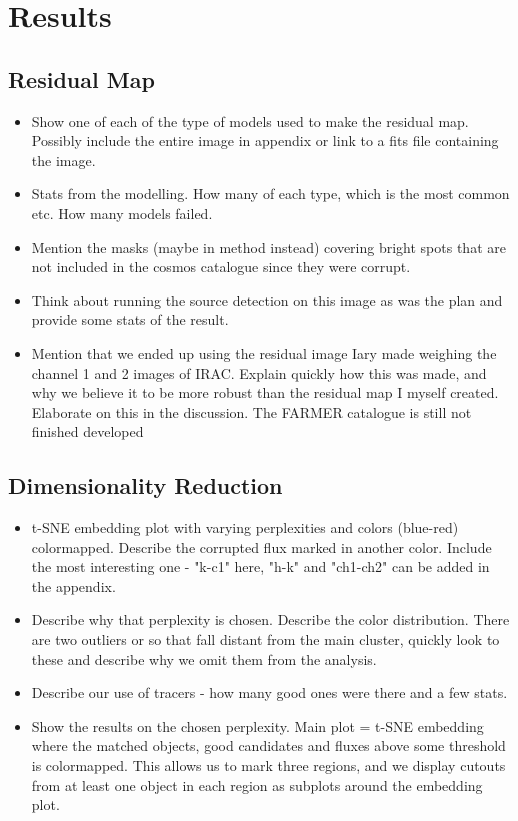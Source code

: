 \section{Results}
\subsection{Residual Map}
\begin{itemize}
    \item Show one of each of the type of models used to make the residual map. Possibly include the entire image in appendix or link to a fits file containing the image.
    \item Stats from the modelling. How many of each type, which is the most common etc. How many models failed.
    \item Mention the masks (maybe in method instead) covering bright spots that are not included in the cosmos catalogue since they were corrupt.
    \item Think about running the source detection on this image as was the plan and provide some stats of the result.
    \item Mention that we ended up using the residual image Iary made weighing the channel 1 and 2 images of IRAC. Explain quickly how this was made, and why we believe it to be more robust than the residual map I myself created. Elaborate on this in the discussion. The FARMER catalogue is still not finished developed
\end{itemize}

\subsection{Dimensionality Reduction}
\begin{itemize}
    \item t-SNE embedding plot with varying perplexities and colors (blue-red) colormapped. Describe the corrupted flux marked in another color. Include the most interesting one - "k-c1" here, "h-k" and "ch1-ch2" can be added in the appendix.
    \item Describe why that perplexity is chosen. Describe the color distribution. There are two outliers or so that fall distant from the main cluster, quickly look to these and describe why we omit them from the analysis.
    \item Describe our use of tracers - how many good ones were there and a few stats.
    \item Show the results on the chosen perplexity. Main plot = t-SNE embedding where the matched objects, good candidates and fluxes above some threshold is colormapped. This allows us to mark three regions, and we display cutouts from at least one object in each region as subplots around the embedding plot.
\end{itemize}


